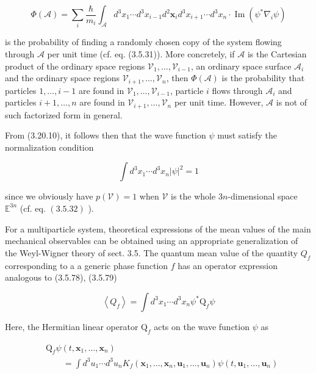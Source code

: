 \documentclass{article}
\begin{document}
\begin{equation*}
\Phi(\mathcal{A})=\sum_{i} \frac{\hbar}{m_{i}} \int_{\mathcal{A}} d^{3} x_{1} \cdots d^{3} x_{i-1} d^{2} \boldsymbol{x}_{i} d^{3} x_{i+1} \cdots d^{3} x_{n} \cdot \operatorname{Im}\left(\psi^{*} \nabla_{i} \psi\right) \tag{3.20.12}
\end{equation*}
 
is the probability of finding a randomly chosen copy of the system flowing through $\mathcal{A}$ per unit time (cf. eq. (3.5.31)). More concretely, if $\mathcal{A}$ is the Cartesian product of the ordinary space regions $\mathcal{V}_{1}, \ldots, \mathcal{V}_{i-1}$, an ordinary space surface $\mathcal{A}_{i}$ and the ordinary space regions $\mathcal{V}_{i+1}, \ldots, \mathcal{V}_{n}$, then $\Phi(\mathcal{A})$ is the probability that particles $1, \ldots, i-1$ are found in $\mathcal{V}_{1}, \ldots, \mathcal{V}_{i-1}$, particle $i$ flows through $\mathcal{A}_{i}$ and particles $i+1, \ldots, n$ are found in $\mathcal{V}_{i+1}, \ldots, \mathcal{V}_{n}$ per unit time. However, $\mathcal{A}$ is not of such factorized form in general.

From (3.20.10), it follows then that the wave function $\psi$ must satisfy the normalization condition
 
\begin{equation*}
\int d^{3} x_{1} \cdots d^{3} x_{n}|\psi|^{2}=1 \tag{3.20.13}
\end{equation*}
 
since we obviously have $p(\mathcal{V})=1$ when $\mathcal{V}$ is the whole $3 n$-dimensional space $\mathbb{E}^{3 n}$ (cf. eq. $(3.5 .32)$ ).

For a multiparticle system, theoretical expressions of the mean values of the main mechanical observables can be obtained using an appropriate generalization
of the Weyl-Wigner theory of sect. 3.5.
The quantum mean value of the quantity $Q_{f}$ corresponding to a a generic phase function $f$ has an operator expression analogous to (3.5.78), (3.5.79)
 
\begin{equation*}
\left\langle Q_{f}\right\rangle=\int d^{3} x_{1} \cdots d^{3} x_{n} \psi^{*} \mathrm{Q}_{f} \psi \tag{3.20.14}
\end{equation*}
 

Here, the Hermitian linear operator $\mathrm{Q}_{f}$ acts on the wave function $\psi$ as
 
\begin{align*}
& \mathrm{Q}_{f} \psi\left(t, \boldsymbol{x}_{1}, \ldots, \boldsymbol{x}_{n}\right)  \tag{3.20.15}\\
& \qquad=\int d^{3} u_{1} \cdots d^{3} u_{n} K_{f}\left(\boldsymbol{x}_{1}, \ldots, \boldsymbol{x}_{n}, \boldsymbol{u}_{1}, \ldots, \boldsymbol{u}_{n}\right) \psi\left(t, \boldsymbol{u}_{1}, \ldots, \boldsymbol{u}_{n}\right)
\end{align*}
 
\end{document}
